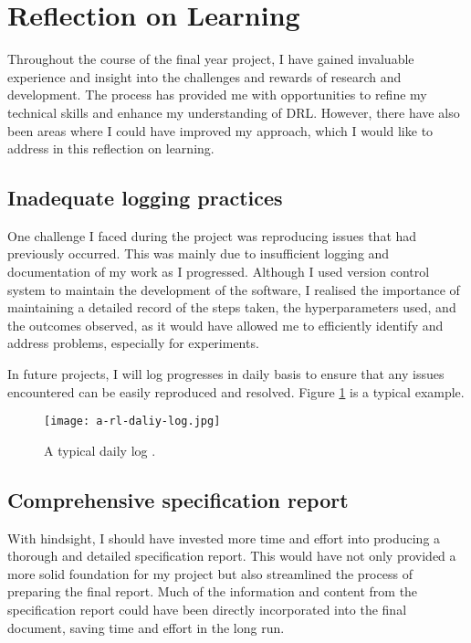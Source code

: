 \section{Reflection on Learning} \label{sec:reflection}

Throughout the course of the final year project, I have gained invaluable experience and insight into the challenges and rewards of research and development. The process has provided me with opportunities to refine my technical skills and enhance my understanding of DRL. However, there have also been areas where I could have improved my approach, which I would like to address in this reflection on learning.

\subsection{Inadequate logging practices}

One challenge I faced during the project was reproducing issues that had previously occurred. This was mainly due to insufficient logging and documentation of my work as I progressed. Although I used version control system to maintain the development of the software, I realised the importance of maintaining a detailed record of the steps taken, the hyperparameters used, and the outcomes observed, as it would have allowed me to efficiently identify and address problems, especially for experiments.

In future projects, I will log progresses in daily basis to ensure that any issues encountered can be easily reproduced and resolved. Figure \ref{fig:daliy-log} is a typical example.

\begin{figure}[htbp]
   \centering
   \texttt{[image: a-rl-daliy-log.jpg]}
   \caption{A typical daily log \cite{ref:reproducing-drl}.}
   \label{fig:daliy-log}
\end{figure}

\subsection{Comprehensive specification report}

With hindsight, I should have invested more time and effort into producing a thorough and detailed specification report. This would have not only provided a more solid foundation for my project but also streamlined the process of preparing the final report. Much of the information and content from the specification report could have been directly incorporated into the final document, saving time and effort in the long run.

